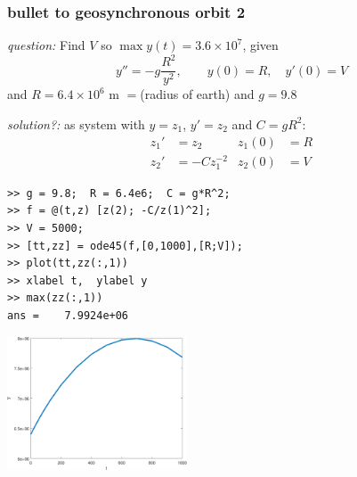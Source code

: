 \documentclass[dvipsnames,colorlinks]{beamer}
\begin{document}
\begin{frame}[fragile]
\frametitle{bullet to geosynchronous orbit 2}

\small

\emph{question:} Find $V$ so $\max y(t) = 3.6\times 10^7$, given
    $$y'' = -g \frac{R^2}{y^2}, \qquad y(0)=R, \quad y'(0)=V$$
and $R=6.4\times 10^6$ m $=$(radius of earth) and $g=9.8$

\emph{solution?:} as system with $y=z_1$, $y'=z_2$ and $C=gR^2$:
\begin{align*}
z_1' &= z_2  & z_1(0)&=R \\
z_2' &= - C z_1^{-2} & z_2(0) &= V
\end{align*}

\begin{Verbatim}[fontsize=\footnotesize]
>> g = 9.8;  R = 6.4e6;  C = g*R^2;
>> f = @(t,z) [z(2); -C/z(1)^2];
>> V = 5000;
>> [tt,zz] = ode45(f,[0,1000],[R;V]);
>> plot(tt,zz(:,1))
>> xlabel t,  ylabel y
>> max(zz(:,1))
ans =    7.9924e+06
\end{Verbatim}

\vspace{-30mm}

\hfill \includegraphics[width=0.4\textwidth]{figs/firstbullet}
\end{frame}
\end{document}
